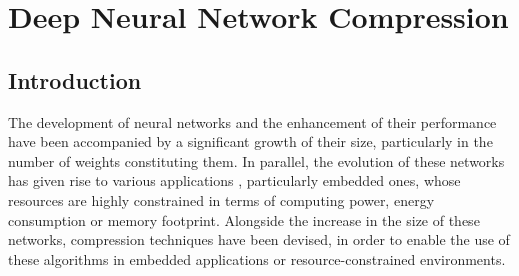 \chapter{Deep Neural Network Compression}
\label{chap:sota}

\localtableofcontents

\section{Introduction}\label{sec:sota:intro}

The development of neural networks and the enhancement of their performance have
been accompanied by a significant growth of their size, particularly in the
number of weights constituting them. In parallel, the evolution of these
networks has given rise to various applications
\cite{DBLP:conf/nips/KrizhevskySH12,DBLP:conf/emnlp/BudzianowskiV19,silver2018general,jumper2021highly},
particularly embedded ones\cite{kim2020review,kuutti2020survey}, whose resources
are highly constrained in terms of computing power, energy consumption or memory
footprint. Alongside the increase in the size of these networks, compression
techniques have been devised, in order to enable the use of these algorithms in
embedded applications or resource-constrained environments.\\


